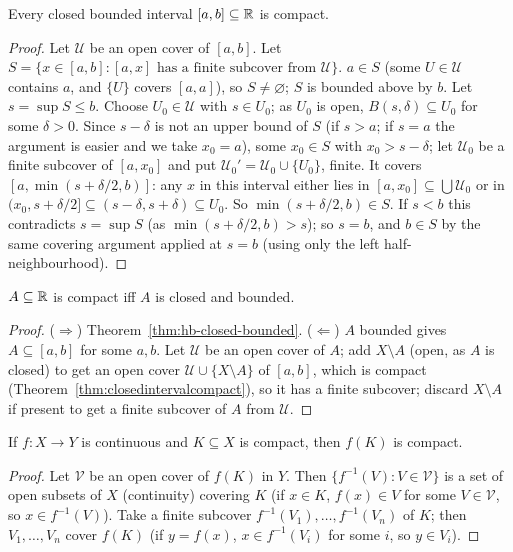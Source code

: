 \begin{theorem}\label{thm:closedintervalcompact}
	Every closed bounded interval $[a,b]\subseteq\mathbb{R}$ is compact.
\end{theorem}
\begin{proof}
	Let $\mathcal U$ be an open cover of $[a,b]$. Let $S=\{x\in[a,b]:[a,x]\text{ has a finite subcover from }\mathcal U\}$. $a\in S$ (some $U\in\mathcal U$ contains $a$, and $\{U\}$ covers $[a,a]$), so $S\ne\varnothing$; $S$ is bounded above by $b$. Let $s=\sup S\le b$. Choose $U_0\in\mathcal U$ with $s\in U_0$; as $U_0$ is open, $B(s,\delta)\subseteq U_0$ for some $\delta>0$. Since $s-\delta$ is not an upper bound of $S$ (if $s>a$; if $s=a$ the argument is easier and we take $x_0=a$), some $x_0\in S$ with $x_0>s-\delta$; let $\mathcal U_0$ be a finite subcover of $[a,x_0]$ and put $\mathcal U_0'=\mathcal U_0\cup\{U_0\}$, finite. It covers $[a,\min(s+\delta/2,b)]$: any $x$ in this interval either lies in $[a,x_0]\subseteq\bigcup\mathcal U_0$ or in $(x_0,s+\delta/2]\subseteq(s-\delta,s+\delta)\subseteq U_0$. So $\min(s+\delta/2,b)\in S$. If $s<b$ this contradicts $s=\sup S$ (as $\min(s+\delta/2,b)>s$); so $s=b$, and $b\in S$ by the same covering argument applied at $s=b$ (using only the left half-neighbourhood).
\end{proof}

\begin{theorem}\label{thm:heineborel}
	$A\subseteq\mathbb{R}$ is compact iff $A$ is closed and bounded.
\end{theorem}
\begin{proof}
	($\Rightarrow$) Theorem~\ref{thm:hb-closed-bounded}. ($\Leftarrow$) $A$ bounded gives $A\subseteq[a,b]$ for some $a,b$. Let $\mathcal U$ be an open cover of $A$; add $X\setminus A$ (open, as $A$ is closed) to get an open cover $\mathcal U\cup\{X\setminus A\}$ of $[a,b]$, which is compact (Theorem~\ref{thm:closedintervalcompact}), so it has a finite subcover; discard $X\setminus A$ if present to get a finite subcover of $A$ from $\mathcal U$.
\end{proof}

\begin{proposition}
	If $f:X\to Y$ is continuous and $K\subseteq X$ is compact, then $f(K)$ is compact.
\end{proposition}
\begin{proof}
	Let $\mathcal V$ be an open cover of $f(K)$ in $Y$. Then $\{f^{-1}(V):V\in\mathcal V\}$ is a set of open subsets of $X$ (continuity) covering $K$ (if $x\in K$, $f(x)\in V$ for some $V\in\mathcal V$, so $x\in f^{-1}(V)$). Take a finite subcover $f^{-1}(V_1),\dots,f^{-1}(V_n)$ of $K$; then $V_1,\dots,V_n$ cover $f(K)$ (if $y=f(x)$, $x\in f^{-1}(V_i)$ for some $i$, so $y\in V_i$).
\end{proof}

